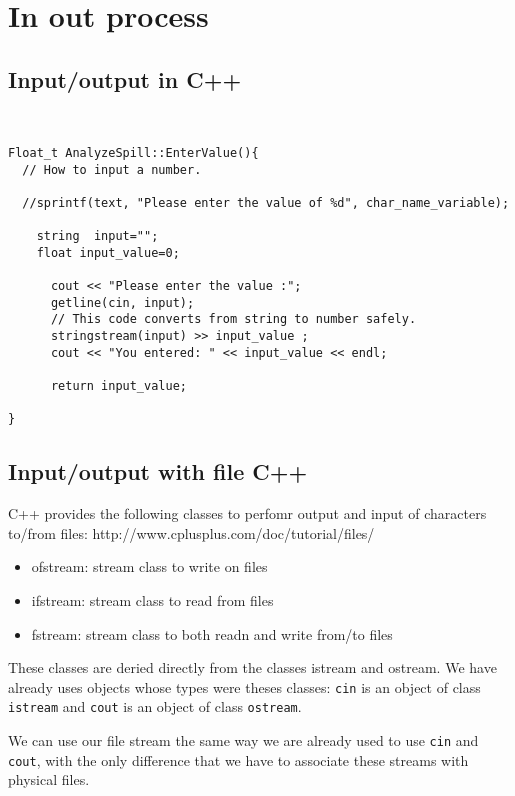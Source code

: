 \section{In out process}

\subsection{Input/output in  C++}

\begin{verbatim}


Float_t AnalyzeSpill::EnterValue(){
  // How to input a number.

  //sprintf(text, "Please enter the value of %d", char_name_variable);

    string  input="";
    float input_value=0;

      cout << "Please enter the value :";
      getline(cin, input);
      // This code converts from string to number safely.
      stringstream(input) >> input_value ;
      cout << "You entered: " << input_value << endl;

      return input_value;

}
\end{verbatim}

\subsection{Input/output with file C++}

C++ provides the following classes to perfomr output and input of characters to/from files: 
http://www.cplusplus.com/doc/tutorial/files/

\begin{itemize}
\item ofstream: stream class to write on files
\item ifstream: stream class to read from files
\item fstream: stream class to both readn and write from/to files
\end{itemize}

These classes are deried directly from the classes istream and ostream. We have already uses objects whose types were theses classes: \verb|cin| is an object of class \verb|istream| and \verb|cout| is an object of class \verb|ostream|.

We can use our file stream the same way we are already used to use \verb|cin| and \verb|cout|, with the only difference that we have to associate these streams with physical files. 


